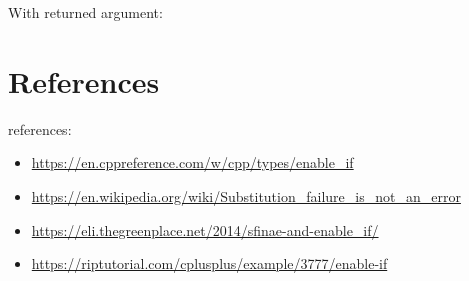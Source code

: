 \documentclass[11pt,a4paper,landscape,twocolumn]{article}
\begin{document}
With returned argument:



\section{References}


references:
\begin{itemize}
\item \url{https://en.cppreference.com/w/cpp/types/enable_if}
\item \url{https://en.wikipedia.org/wiki/Substitution_failure_is_not_an_error}
\item \url{https://eli.thegreenplace.net/2014/sfinae-and-enable_if/}
\item \url{https://riptutorial.com/cplusplus/example/3777/enable-if}
\end{itemize}
\end{document}
